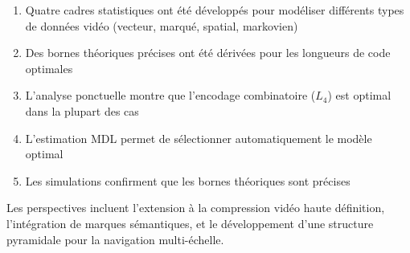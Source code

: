 \documentclass[11pt,a4paper]{article}
\begin{document}
	\begin{enumerate}
		\item Quatre cadres statistiques ont été développés pour modéliser différents types de données vidéo (vecteur, marqué, spatial, markovien)
		\item Des bornes théoriques précises ont été dérivées pour les longueurs de code optimales
		\item L'analyse ponctuelle montre que l'encodage combinatoire ($L_4$) est optimal dans la plupart des cas
		\item L'estimation MDL permet de sélectionner automatiquement le modèle optimal
		\item Les simulations confirment que les bornes théoriques sont précises
	\end{enumerate}
	
	Les perspectives incluent l'extension à la compression vidéo haute définition, l'intégration de marques sémantiques, et le développement d'une structure pyramidale pour la navigation multi-échelle.
	
	\newpage
	
	
	
\end{document}
